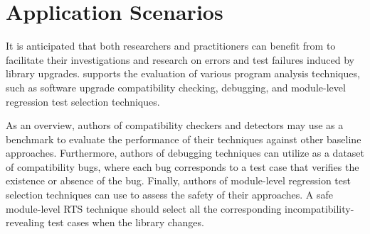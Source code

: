 \section{Application Scenarios}\label{sec:app-compsuite}

It is anticipated that both researchers and practitioners can benefit from
\toolcompsuite to facilitate their investigations and research on errors
and test failures induced by library upgrades. \toolcompsuite supports the evaluation of
various program analysis techniques, such as software upgrade compatibility checking, debugging,
and module-level regression test selection techniques.


As an overview, authors of compatibility checkers and detectors
may use \toolcompsuite as a benchmark to evaluate the performance of their
techniques against other baseline approaches. Furthermore, authors of
debugging techniques can utilize \toolcompsuite as a dataset of compatibility
bugs, where each bug corresponds to a test case that verifies the
existence or absence of the bug. Finally, authors of module-level
regression test selection techniques can use \toolcompsuite to assess the
safety of their approaches. A safe module-level RTS technique should
select all the corresponding incompatibility-revealing test cases when
the library changes.



